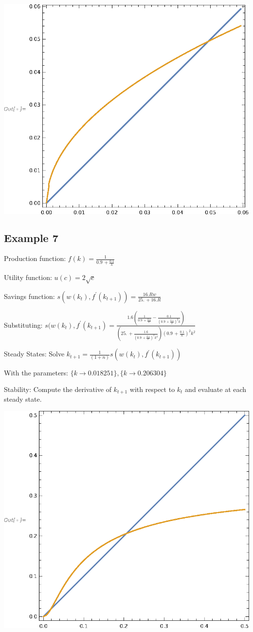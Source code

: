 \documentclass[11pt, a4paper]{article}
\begin{document}
\includegraphics{xamples_gr6.eps}

\subsection*{Example 7}
Production function:    $f(k)=\frac{1}{0.9\, +\frac{0.1}{k}}$

Utility function:       $u(c)=2 \sqrt{c}$

Savings function:       $s(w(k_t),f^\prime(k_{t+1}))= \frac{16. R w}{25.\, +16. R}$

Substituting:           $s(w(k_t),f^\prime(k_{t+1})= \frac{1.6 \left(\frac{1}{0.9\, +\frac{0.1}{k}}-\frac{0.1}{\left(0.9\, +\frac{0.1}{k}\right)^2 k}\right)}{\left(25.\, +\frac{1.6}{\left(0.9\, +\frac{0.1}{k}\right)^2 k^2}\right) \left(0.9\, +\frac{0.1}{k}\right)^2 k^2}$

Steady States:          Solve ${k}_{t+1}= \frac{1}{(1+n)}s(w(k_t),f^\prime(k_{t+1}))$

With the parameters: $\{k\to 0.018251\},\{k\to 0.206304\}$

Stability:             Compute the derivative of $k_{t+1}$ with respect to $k_{t}$ and evaluate at each steady state.

\includegraphics{xamples_gr7.eps}
\end{document}
